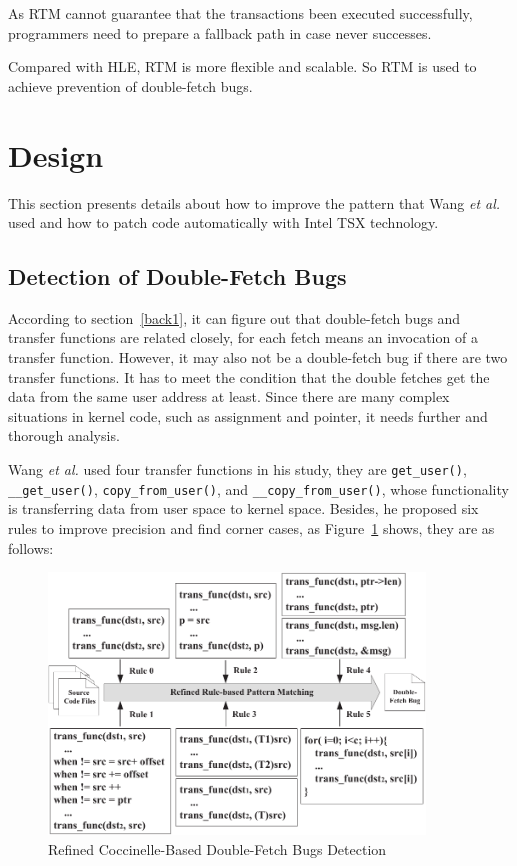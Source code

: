 \documentclass[10pt]{llncs}
\begin{document}
As RTM cannot guarantee that the transactions been executed successfully, programmers need to prepare a fallback path in case never successes.

Compared with HLE, RTM is more flexible and scalable. So RTM is used to achieve prevention of double-fetch bugs. 
\section{Design}%
\label{design}

This section presents details about how to improve the pattern that Wang \textit{et al.} used and how to patch code automatically with Intel TSX technology.
\subsection{Detection of Double-Fetch Bugs}
\label{design1}
According to section~\ref{back1}, it can figure out that double-fetch bugs and transfer functions are related closely, for each fetch means an invocation of a transfer function. However, it may also not be a double-fetch bug if there are two transfer functions. It has to meet the condition that the double fetches get the data from the same user address at least. Since there are many complex situations in kernel code, such as assignment and pointer, it needs further and thorough analysis.

Wang \textit{et al.} used four transfer functions in his study, they are \verb:get_user():, \verb:__get_user():, \verb:copy_from_user():, and \verb:__copy_from_user():, whose functionality is transferring data from user space to kernel space. Besides, he proposed six rules to improve precision and find corner cases, as Figure~\ref{Cocci} shows, they are as follows:

\begin{figure}
  \centering
  \includegraphics[width=10cm]{refined}
  \caption{Refined Coccinelle-Based Double-Fetch Bugs Detection~\cite{wang}}
  \label{Cocci}
\end{figure}
\end{document}
